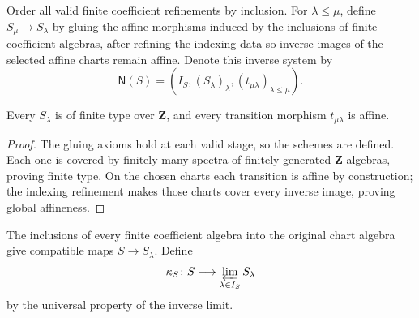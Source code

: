 \begin{definition}
  \label{def:nagata-noetherian-inverse-system}

  Order all valid finite coefficient refinements by inclusion.  For
  $\lambda\leq\mu$, define
  $S_\mu\to S_\lambda$ by gluing the affine morphisms induced by the
  inclusions of finite coefficient algebras, after refining the indexing data
  so inverse images of the selected affine charts remain affine.  Denote this
  inverse system by
  \[
    \mathsf N(S)=(I_S,(S_\lambda)_\lambda,
      (t_{\mu\lambda})_{\lambda\leq\mu}).
  \]
\end{definition}

\begin{lemma}
  \label{lemma:nagata-glue-noetherian-stage}

  Every $S_\lambda$ is of finite type over $\mathbf Z$, and every transition
  morphism $t_{\mu\lambda}$ is affine.
\end{lemma}

\begin{proof}
  The gluing axioms hold at each valid stage, so the schemes are defined.
  Each one is covered by finitely many spectra of finitely generated
  $\mathbf Z$-algebras, proving finite type.  On the chosen charts each
  transition is affine by construction; the indexing refinement makes those
  charts cover every inverse image, proving global affineness.
\end{proof}

\begin{definition}
  \label{def:nagata-glued-limit-comparison}

  The inclusions of every finite coefficient algebra into the original chart
  algebra give compatible maps $S\to S_\lambda$.  Define
  \[
    \kappa_S\colon S\longrightarrow\varprojlim_{\lambda\in I_S}S_\lambda
  \]
  by the universal property of the inverse limit.
\end{definition}

